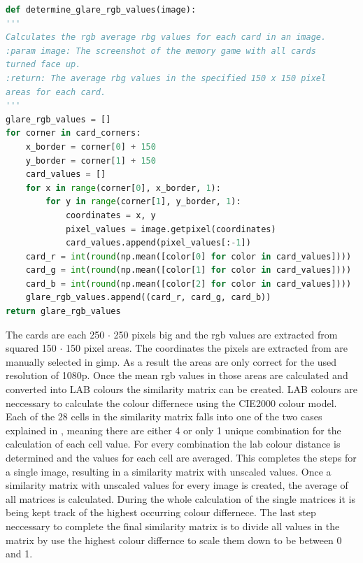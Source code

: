 \begin{lstlisting}[language=python, caption=Add caption, xleftmargin=5.0ex]
def determine_glare_rgb_values(image):
'''
Calculates the rgb average rbg values for each card in an image.
:param image: The screenshot of the memory game with all cards 
turned face up.
:return: The average rbg values in the specified 150 x 150 pixel 
areas for each card. 
'''
glare_rgb_values = []
for corner in card_corners:
	x_border = corner[0] + 150
	y_border = corner[1] + 150
	card_values = []
	for x in range(corner[0], x_border, 1):
		for y in range(corner[1], y_border, 1):
			coordinates = x, y
			pixel_values = image.getpixel(coordinates)
			card_values.append(pixel_values[:-1])
	card_r = int(round(np.mean([color[0] for color in card_values])))
	card_g = int(round(np.mean([color[1] for color in card_values])))
	card_b = int(round(np.mean([color[2] for color in card_values])))
	glare_rgb_values.append((card_r, card_g, card_b))
return glare_rgb_values 
\end{lstlisting}
The cards are each 250 $\cdot$ 250 pixels big and the rgb values are extracted from squared 150 $\cdot$ 150 pixel areas. The coordinates the pixels are extracted from are manually selected in gimp. As a result the areas are only correct for the used resolution of 1080p. Once the mean rgb values in those areas are calculated and converted into LAB colours the similarity matrix can be created. LAB colours are neccessary to calculate the colour differnece using the CIE2000 colour model. Each of the 28 cells in the similarity matrix falls into one of the two cases explained in , meaning there are either 4 or only 1 unique combination for the calculation of each cell value. For every combination the lab colour distance is determined and the values for each cell are averaged. This completes the steps for a single image, resulting in a similarity matrix with unscaled values. 
%	
Once a similarity matrix with unscaled values for every image is created, the average of all matrices is calculated. During the whole calculation of the single matrices it is being kept track of the highest occurring colour differnece. The last step neccessary to complete the final similarity matrix is to divide all values in the matrix by use the highest colour differnce to scale them down to be between 0 and 1. 

